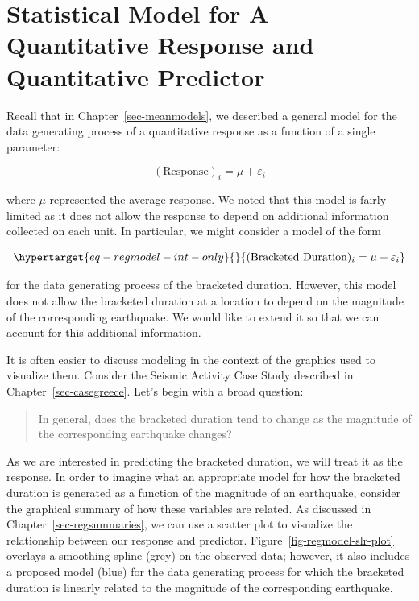 \documentclass[
  letterpaper,
  DIV=11,
  numbers=noendperiod]{scrreprt}
\theoremstyle{definition}
\theoremstyle{definition}
\theoremstyle{plain}
\theoremstyle{remark}
\begin{document}
\hypertarget{statistical-model-for-a-quantitative-response-and-quantitative-predictor}{%
\section{Statistical Model for A Quantitative Response and Quantitative
Predictor}\label{statistical-model-for-a-quantitative-response-and-quantitative-predictor}}

Recall that in Chapter~\ref{sec-meanmodels}, we described a general
model for the data generating process of a quantitative response as a
function of a single parameter:

\[(\text{Response})_i = \mu + \varepsilon_i\]

where \(\mu\) represented the average response. We noted that this model
is fairly limited as it does not allow the response to depend on
additional information collected on each unit. In particular, we might
consider a model of the form

\begin{equation}\protect\hypertarget{eq-regmodel-int-only}{}{(\text{Bracketed Duration})_i = \mu + \varepsilon_i}\label{eq-regmodel-int-only}\end{equation}

for the data generating process of the bracketed duration. However, this
model does not allow the bracketed duration at a location to depend on
the magnitude of the corresponding earthquake. We would like to extend
it so that we can account for this additional information.

It is often easier to discuss modeling in the context of the graphics
used to visualize them. Consider the Seismic Activity Case Study
described in Chapter~\ref{sec-casegreece}. Let's begin with a broad
question:

\begin{quote}
In general, does the bracketed duration tend to change as the magnitude
of the corresponding earthquake changes?
\end{quote}

As we are interested in predicting the bracketed duration, we will treat
it as the response. In order to imagine what an appropriate model for
how the bracketed duration is generated as a function of the magnitude
of an earthquake, consider the graphical summary of how these variables
are related. As discussed in Chapter~\ref{sec-regsummaries}, we can use
a scatter plot to visualize the relationship between our response and
predictor. Figure~\ref{fig-regmodel-slr-plot} overlays a smoothing
spline (grey) on the observed data; however, it also includes a proposed
model (blue) for the data generating process for which the bracketed
duration is linearly related to the magnitude of the corresponding
earthquake.
\end{document}
